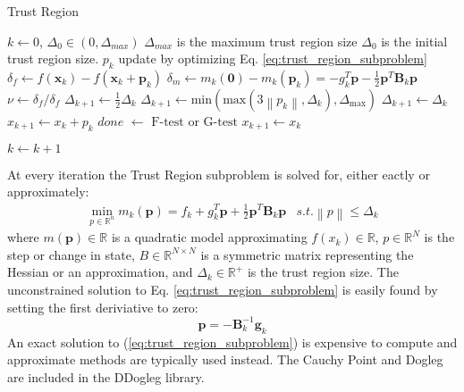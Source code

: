 \documentclass[peerreview,compsoc,onecolumn]{IEEEtran}
\newcommand{\R}{\mathbb{R}}
\newcommand{\norm}[1]{\left\lVert#1\right\rVert}
\begin{document}
\begin{algorithm}{}
\caption{\label{alg:trust_region}Trust Region}
\begin{algorithmic}[1]
	\State $k \gets 0$, $\Delta_0 \in (0,\Delta_{max})$
	\State \quad $\Delta_{max}$ is the maximum trust region size
	\State \quad $\Delta_{0}$ is the initial trust region size. 
	\State $p_k$ update by optimizing Eq. \ref{eq:trust_region_subproblem} 
	\State $\delta_f \gets f(\bm{x}_k) - f(\bm{x}_k + \bm{p}_k)$ 
	\State $\delta_m \gets m_k(\bm{0})-m_k(\bm{p}_k) = -g^T_k \bm{p} - \frac{1}{2}\bm{p}^T \bm{B}_k \bm{p}$ 
	\State $\nu \gets \delta_f / \delta_f$  
	 
		\State $\Delta_{k+1} \gets \frac{1}{2}\Delta_k$
	\Else
			\State $\Delta_{k+1} \gets \mbox{min}(\mbox{max}(3\norm{p_k},\Delta_k),\Delta_{\mbox{max}})$
		\Else
			\State $\Delta_{k+1} \gets \Delta_k$
		\EndIf
	\EndIf
	 
		\State $x_{k+1} \gets x_k + p_k$ 
		\State $done$ $\gets$ $\mbox{F-test}$ or $\mbox{G-test}$ 
	\Else
		\State $x_{k+1} \gets x_k$
	\EndIf

	\State $k \gets k + 1$
	\EndWhile
\end{algorithmic}
\end{algorithm}

At every iteration the Trust Region subproblem is solved for, either eactly or approximately:
\begin{equation}
\begin{array}{lr}
\min\limits_{p\in \R^n} m_k(\bm{p}) = f_k + g^T_k \bm{p} + \frac{1}{2}\bm{p}^T \bm{B}_k \bm{p} & s.t. \norm{p} \le \Delta_k
\end{array}
\label{eq:trust_region_subproblem}
\end{equation}
where $m(\bm{p}) \in \R$ is a quadratic model approximating $f(x_k) \in \R$, $p \in \R^N$ is the step or change in state, $B \in \R^{N \times N}$ is a symmetric matrix representing the Hessian or an approximation, and $\Delta_k \in \R^+$ is the trust region size. The unconstrained solution to Eq. \ref{eq:trust_region_subproblem} is easily found by setting the first deriviative to zero:
\begin{equation}
\bm{p} = -\bm{B}^{-1}_k \bm{g}_k
\label{eq:TR_unconstrained_solution}
\end{equation}
An exact solution to (\ref{eq:trust_region_subproblem}) is expensive to compute and approximate methods are typically used instead. The Cauchy Point and Dogleg are included in the DDogleg library.
\end{document}

